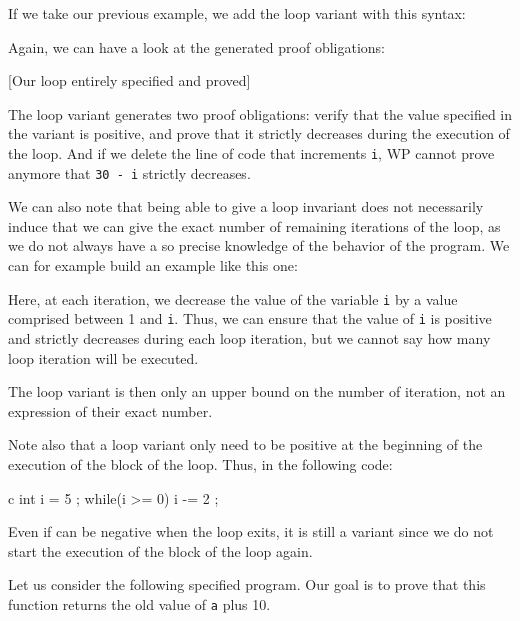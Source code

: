 If we take our previous example, we add the loop variant with this
syntax:






Again, we can have a look at the generated proof obligations:



[Our loop entirely specified and proved]


The loop variant generates two proof obligations: verify that the value
specified in the variant is positive, and prove that it strictly
decreases during the execution of the loop. And if we delete the line of
code that increments \texttt{i}, WP cannot prove anymore that
\texttt{30\ -\ i} strictly decreases.

We can also note that being able to give a loop invariant does not
necessarily induce that we can give the exact number of remaining
iterations of the loop, as we do not always have a so precise knowledge
of the behavior of the program. We can for example build an example like
this one:






Here, at each iteration, we decrease the value of the variable
\texttt{i} by a value comprised between 1 and \texttt{i}. Thus, we can
ensure that the value of \texttt{i} is positive and strictly decreases
during each loop iteration, but we cannot say how many loop iteration
will be executed.



The loop variant is then only an upper bound on the number of iteration,
not an expression of their exact number.


Note also that a loop variant only need to be positive at the beginning
of the execution of the block of the loop. Thus, in the following code:


\begin{CodeBlock}{c}
int i = 5 ;
while(i >= 0){
  i -= 2 ;
}
\end{CodeBlock}

Even if  can be negative when the loop exits, it is still
a variant since we do not start the execution of the block of the loop
again.




Let us consider the following specified program. Our goal is to prove
that this function returns the old value of \texttt{a} plus 10.



